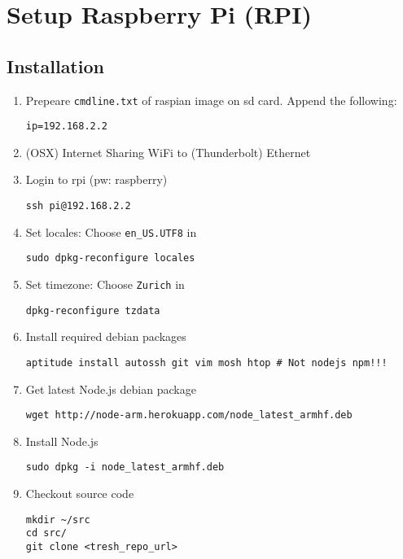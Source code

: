\section{Setup Raspberry Pi (RPI)}\label{setup-raspberry-pi-rpi}

\subsection*{Installation}\label{installation}

\begin{enumerate}
\def\labelenumi{\arabic{enumi}.}
\item
  Prepeare \texttt{cmdline.txt} of raspian image on sd card. Append the
  following:

\begin{verbatim}
ip=192.168.2.2
\end{verbatim}
\item
  (OSX) Internet Sharing WiFi to (Thunderbolt) Ethernet
\item
  Login to rpi (pw: raspberry)

\begin{verbatim}
ssh pi@192.168.2.2
\end{verbatim}
\item
  Set locales: Choose \texttt{en\_US.UTF8} in

\begin{verbatim}
sudo dpkg-reconfigure locales
\end{verbatim}
\item
  Set timezone: Choose \texttt{Zurich} in

\begin{verbatim}
dpkg-reconfigure tzdata
\end{verbatim}
\item
  Install required debian packages

\begin{verbatim}
aptitude install autossh git vim mosh htop # Not nodejs npm!!!
\end{verbatim}
\item
  Get latest Node.js debian package

\begin{verbatim}
wget http://node-arm.herokuapp.com/node_latest_armhf.deb
\end{verbatim}
\item
  Install Node.js

\begin{verbatim}
sudo dpkg -i node_latest_armhf.deb
\end{verbatim}
\item
  Checkout source code

\begin{verbatim}
mkdir ~/src
cd src/
git clone <tresh_repo_url>
\end{verbatim}
\end{enumerate}

